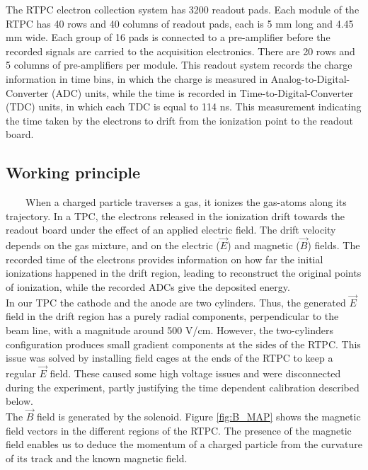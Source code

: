  The RTPC electron collection system has 3200 readout pads. Each module of the 
 RTPC has 40 rows and 40 columns of readout pads, each is 5 mm long and 4.45 mm 
 wide. Each group of 16 pads is connected to a pre-amplifier before the 
 recorded signals are carried to the acquisition electronics. There are 20 
 rows and 5 columns of pre-amplifiers per module. This readout system records 
 the charge information in time bins, in which the charge is measured in 
 Analog-to-Digital-Converter (ADC) units, while the time is 
 recorded in Time-to-Digital-Converter (TDC) units, in which each TDC is equal 
 to 114 ns. This measurement indicating the time taken by the electrons to drift from the 
 ionization point to the readout board. 

 
\subsection{Working principle}
~~~~When a charged particle traverses a gas, it ionizes the gas-atoms along its trajectory. In a TPC, the electrons released in the ionization drift towards the readout board under the effect of an applied electric field. The drift velocity depends on the gas mixture, and on the electric ($\vec{E}$) and magnetic ($\vec{B}$) fields. The recorded time of the electrons provides information on how far the initial ionizations happened in the drift region, leading to reconstruct the original points of ionization, while the recorded ADCs give the deposited energy.\\

In our TPC the cathode and the anode are two cylinders. Thus, the generated $\vec{E}$ field in the drift region has a purely radial components, perpendicular to the beam line, with a magnitude around 500 V/cm. However, the two-cylinders configuration produces small gradient components at the sides of the RTPC. This issue was solved by installing field cages at the ends of the RTPC to keep a regular $\vec{E}$ field. These caused some high voltage issues and were disconnected during the experiment, partly justifying the time dependent calibration described below. \\

 The $\vec{B}$ field is generated by the solenoid. Figure \ref{fig:B_MAP} shows the magnetic field vectors in the different regions of the RTPC. The presence of the magnetic field enables us to deduce the momentum of a charged particle from the curvature of its track and the known magnetic field.

